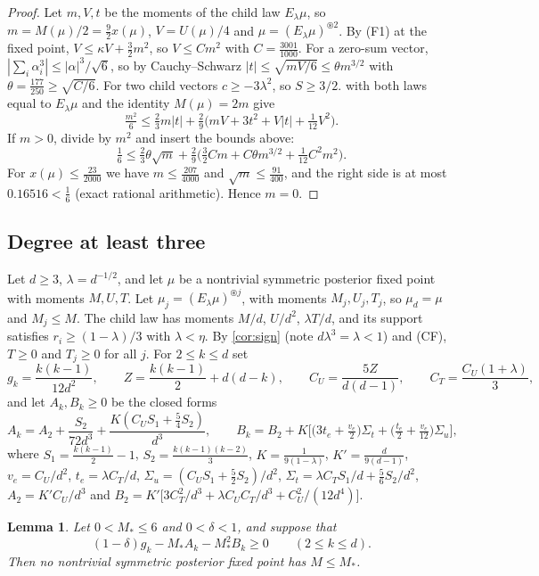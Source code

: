 \documentclass[11pt]{amsart}
\newtheorem{lemma}[theorem]{Lemma}
\theoremstyle{definition}
\theoremstyle{remark}
\begin{document}
\begin{proof}
Let $m,V,t$ be the moments of the child law $E_\lambda\mu$, so $m=M(\mu)/2=\tfrac92x(\mu)$, $V=U(\mu)/4$ and
$\mu=(E_\lambda\mu)^{\circledast2}$. By (F1) at the fixed point, $V\le\kappa V+\tfrac32m^2$, so
$V\le Cm^2$ with $C=\tfrac{3001}{1000}$. For a zero-sum vector, $|\sum_i\alpha_i^3|\le|\alpha|^3/\sqrt6$, so by
Cauchy--Schwarz $|t|\le\sqrt{mV/6}\le\theta m^{3/2}$ with $\theta=\tfrac{177}{250}\ge\sqrt{C/6}$. For two child
vectors $c\ge-3\lambda^2$, so $S\ge3/2$.  with both laws equal to $E_\lambda\mu$ and the
identity $M(\mu)=2m$ give
\[
\tfrac{m^2}6\le\tfrac23m|t|+\tfrac29\big(mV+3t^2+V|t|+\tfrac1{12}V^2\big).
\]
If $m>0$, divide by $m^2$ and insert the bounds above:
\[
\tfrac16\le\tfrac23\theta\sqrt m+\tfrac29\big(\tfrac32Cm+C\theta m^{3/2}+\tfrac1{12}C^2m^2\big).
\]
For $x(\mu)\le\tfrac{23}{2000}$ we have $m\le\tfrac{207}{4000}$ and $\sqrt m\le\tfrac{91}{400}$, and the right side
is at most $0.16516<\tfrac16$ (exact rational arithmetic). Hence $m=0$.
\end{proof}

\subsection{Degree at least three}
Let $d\ge3$, $\lambda=d^{-1/2}$, and let $\mu$ be a nontrivial symmetric posterior fixed point with moments
$M,U,T$. Let $\mu_j=(E_\lambda\mu)^{\circledast j}$, with moments $M_j,U_j,T_j$, so $\mu_d=\mu$ and
$M_j\le M$. The child law has moments $M/d$, $U/d^2$, $\lambda T/d$, and its support satisfies $r_i\ge(1-\lambda)/3$
with $\lambda<\eta$. By \cref{cor:sign} (note $d\lambda^3=\lambda<1$) and (CF), $T\ge0$ and $T_j\ge0$ for all $j$.
For $2\le k\le d$ set
\[
g_k=\frac{k(k-1)}{12d^2},\qquad Z=\frac{k(k-1)}2+d(d-k),\qquad C_U=\frac{5Z}{d(d-1)},\qquad
C_T=\frac{C_U(1+\lambda)}3,
\]
and let $A_k,B_k\ge0$ be the closed forms
\[
A_k=A_2+\frac{S_2}{72d^3}+\frac{K(C_US_1+\tfrac54S_2)}{d^3},\qquad
B_k=B_2+K\Big[\big(3t_e+\tfrac{v_e}2\big)\Sigma_t+\big(\tfrac{t_e}2+\tfrac{v_e}{12}\big)\Sigma_u\Big],
\]
where $S_1=\tfrac{k(k-1)}2-1$, $S_2=\tfrac{k(k-1)(k-2)}3$, $K=\frac1{9(1-\lambda)}$, $K'=\frac d{9(d-1)}$,
$v_e=C_U/d^2$, $t_e=\lambda C_T/d$, $\Sigma_u=(C_US_1+\tfrac52S_2)/d^2$, $\Sigma_t=\lambda C_TS_1/d+\tfrac56S_2/d^2$,
$A_2=K'C_U/d^3$ and $B_2=K'\big[3C_T^2/d^3+\lambda C_UC_T/d^3+C_U^2/(12d^4)\big]$.

\begin{lemma}\label{lem:prefix}
Let $0<M_*\le6$ and $0<\delta<1$, and suppose that
\begin{equation}\label{eq:criterion}
(1-\delta)g_k-M_*A_k-M_*^2B_k\ge0\qquad(2\le k\le d).
\end{equation}
Then no nontrivial symmetric posterior fixed point has $M\le M_*$.
\end{lemma}
\end{document}

